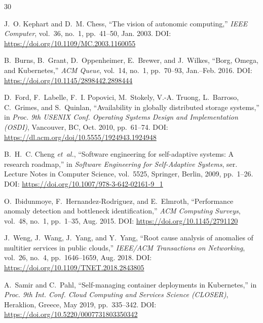 \documentclass[journal,10pt,twoside]{IEEEtran}
\begin{document}
\begin{thebibliography}{30}

J.~O. Kephart and D.~M. Chess,
``The vision of autonomic computing,''
\textit{IEEE Computer}, vol.~36, no.~1, pp.~41--50, Jan. 2003.
\newblock DOI: \url{https://doi.org/10.1109/MC.2003.1160055}

B.~Burns, B.~Grant, D.~Oppenheimer, E.~Brewer, and J.~Wilkes,
``Borg, Omega, and Kubernetes,''
\textit{ACM Queue}, vol.~14, no.~1, pp.~70--93, Jan.--Feb. 2016.
\newblock DOI: \url{https://doi.org/10.1145/2898442.2898444}

D.~Ford, F.~Labelle, F.~I. Popovici, M.~Stokely, V.-A. Truong,
L.~Barroso, C.~Grimes, and S.~Quinlan,
``Availability in globally distributed storage systems,''
in \textit{Proc. 9th USENIX Conf. Operating Systems Design and
Implementation (OSDI)}, Vancouver, BC, Oct. 2010, pp.~61--74.
\newblock DOI: \url{https://dl.acm.org/doi/10.5555/1924943.1924948}

B.~H.~C. Cheng \textit{et~al.},
``Software engineering for self-adaptive systems: A research roadmap,''
in \textit{Software Engineering for Self-Adaptive Systems},
ser. Lecture Notes in Computer Science, vol.~5525,
Springer, Berlin, 2009, pp.~1--26.
\newblock DOI: \url{https://doi.org/10.1007/978-3-642-02161-9_1}

O.~Ibidunmoye, F.~Hernandez-Rodriguez, and E.~Elmroth,
``Performance anomaly detection and bottleneck identification,''
\textit{ACM Computing Surveys}, vol.~48, no.~1, pp.~1--35, Aug. 2015.
\newblock DOI: \url{https://doi.org/10.1145/2791120}

J.~Weng, J.~Wang, J.~Yang, and Y.~Yang,
``Root cause analysis of anomalies of multitier services in public clouds,''
\textit{IEEE/ACM Transactions on Networking}, vol.~26, no.~4,
pp.~1646--1659, Aug. 2018.
\newblock DOI: \url{https://doi.org/10.1109/TNET.2018.2843805}

A.~Samir and C.~Pahl,
``Self-managing container deployments in Kubernetes,''
in \textit{Proc. 9th Int. Conf. Cloud Computing and Services Science
(CLOSER)}, Heraklion, Greece, May 2019, pp.~335--342.
\newblock DOI: \url{https://doi.org/10.5220/0007731803350342}


\end{thebibliography}
\end{document}
